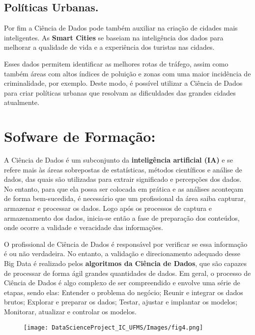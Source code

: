 \documentclass[12pt]{article}
\begin{document}
\subsection{Políticas Urbanas.}

Por fim a Ciência de Dados pode também auxiliar na criação de cidades mais inteligentes. As \textbf{Smart Cities} se baseiam na inteligência dos dados para melhorar a qualidade de vida e a experiência dos turistas nas cidades.

Esses dados permitem identificar as melhores rotas de tráfego, assim como também áreas com altos índices de poluição e zonas com uma maior incidência de criminalidade, por exemplo. Deste modo, é possível utilizar a Ciência de Dados para criar políticas urbanas que resolvam as dificuldades das grandes cidades atualmente.

\section{Sofware de Formação:}

A Ciência de Dados é um subconjunto da \textbf{inteligência artificial (IA)} e se refere mais às áreas sobrepostas de estatísticas, métodos científicos e análise de dados, das quais são utilizadas para extrair significado e percepções dos dados. No entanto, para que ela possa ser colocada em prática e as análises aconteçam de forma bem-sucedida, é necessário que um profissional da área saiba capturar, armazenar e processar os dados. Logo após os processos de captura e armazenamento dos dados, inicia-se então a fase de preparação dos conteúdos, onde ocorre a validade e veracidade das informações.

O profissional de Ciência de Dados é responsável por verificar se essa informação é ou não verdadeira. No entanto, a validação e direcionamento adequado desse Big Data é realizado pelos \textbf{algoritmos da Ciência de Dados}, que são capazes de processar de forma ágil grandes quantidades de dados. Em geral, o processo de Ciência de Dados é algo complexo de ser compreendido e envolve uma série de etapas, sendo elas: Entender o problema do negócio; Reunir e integrar os dados brutos; Explorar e preparar os dados; Testar, ajustar e implantar os modelos; Monitorar, atualizar e controlar os modelos.

\begin{figure}[ht]
\centering
\texttt{[image: DataScienceProject\_IC\_UFMS/Images/fig4.png]}
\end{figure}
\end{document}
